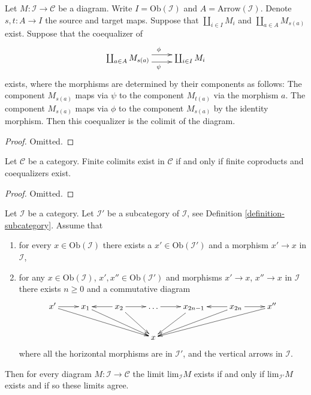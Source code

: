 \begin{lemma}
\label{lemma-colimits-coproducts-coequalizers}
Let $M : \mathcal{I} \to \mathcal{C}$ be a diagram.
Write $I = \text{Ob}(\mathcal{I})$ and $A = \text{Arrow}(\mathcal{I})$.
Denote $s,t : A \to I$ the source and target maps.
Suppose that $\coprod_{i \in I} M_i$ and $\coprod_{a \in A} M_{s(a)}$
exist. Suppose that the coequalizer of 
$$
\xymatrix{
\coprod_{a \in A} M_{s(a)}
\ar@<1ex>[r]^\phi \ar@<-1ex>[r]_\psi
&
\coprod_{i \in I} M_{i}
}
$$
exists, where the morphisms are determined by their components
as follows: The component $M_{s(a)}$ maps via $\psi$
to the component $M_{t(a)}$ via the morphism $a$.
The component $M_{s(a)}$ maps via $\phi$ to the component
$M_{s(a)}$ by the identity morphism. Then this coequalizer is the
colimit of the diagram.
\end{lemma}

\begin{proof}
Omitted.
\end{proof}

\begin{lemma}
\label{lemma-colimits-exist}
Let $\mathcal{C}$ be a category.
Finite colimits exist in $\mathcal{C}$ if and
only if finite coproducts and coequalizers exist.
\end{lemma}

\begin{proof}
Omitted.
\end{proof}


\begin{lemma}
\label{lemma-limit-final-subcategory}
Let $\mathcal{I}$ be a category.
Let $\mathcal{I}'$ be a subcategory of $\mathcal{I}$, see
Definition \ref{definition-subcategory}.
Assume that
\begin{enumerate}
\item for every $x \in \text{Ob}(\mathcal{I})$
there exists a $x' \in \text{Ob}(\mathcal{I}')$ and
a morphism $x' \to x$ in $\mathcal{I}$,
\item for any $x \in \text{Ob}(\mathcal{I})$,
$x' , x'' \in \text{Ob}(\mathcal{I}')$
and morphisms $x' \to x$, $x'' \to x$ in $\mathcal{I}$
there exists $n \geq 0$ and a commutative diagram
$$
\xymatrix{
x' \ar[r] \ar[rrrd] & x_1 \ar[rrd] & x_2 \ar[rd] \ar[l] \ar[r] & \ldots \ar[r]
& x_{2n - 1} \ar[ld] & x_{2n} \ar[lld] \ar[l] \ar[r] & x'' \ar[llld] \\
& & & x & & & 
}
$$
where all the horizontal morphisms are in $\mathcal{I}'$,
and the vertical arrows in $\mathcal{I}$.
\end{enumerate}
Then for every diagram $M : \mathcal{I} \to \mathcal{C}$
the limit $\text{lim}_\mathcal{I} M$ exists if and only
if $\text{lim}_{\mathcal{I}'} M$ exists and if so these limits
agree.
\end{lemma}

